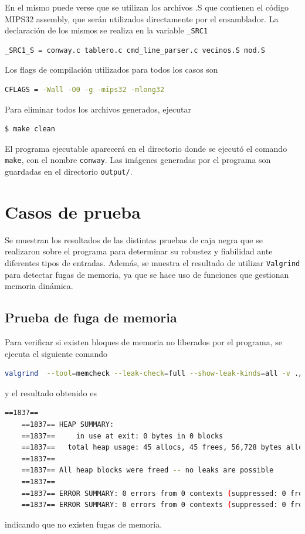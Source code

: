 \documentclass[a4paper,12pt]{article}
\numberwithin{equation}{section}
\numberwithin{figure}{section}
\begin{document}
	En el mismo puede verse que se utilizan los archivos .S que contienen el código MIPS32 assembly, que serán utilizados directamente por el ensamblador. La declaración de los mismos se realiza en la variable \texttt{\_SRC1}
	\begin{lstlisting}[language=bash, style=StyleC]
	_SRC1_S = conway.c tablero.c cmd_line_parser.c vecinos.S mod.S
	\end{lstlisting}
	
	Los flags de compilación utilizados para todos los casos son
	\begin{lstlisting}[language=bash, style=StyleC]
	CFLAGS = -Wall -O0 -g -mips32 -mlong32
	\end{lstlisting}
	
	Para eliminar todos los archivos generados, ejecutar
	\begin{lstlisting}[language=bash, style=StyleC]
	$ make clean
	\end{lstlisting}
	
	El programa ejecutable aparecerá en el directorio donde se ejecutó el comando \texttt{make}, con el nombre \texttt{conway}. Las imágenes generadas por el programa son guardadas en el directorio \texttt{output/}.
	
	\clearpage
	\section{Casos de prueba}
	
	Se muestran los resultados de las distintas pruebas de caja negra que se realizaron sobre el programa para determinar su robustez y fiabilidad ante diferentes tipos de entradas. Además, se muestra el resultado de utilizar \texttt{Valgrind} para detectar fugas de memoria, ya que se hace uso de funciones que gestionan memoria dinámica.
	
	\subsection{Prueba de fuga de memoria}
	
	Para verificar si existen bloques de memoria no liberados por el programa, se ejecuta el siguiente comando
	\begin{lstlisting}[language=bash, style=StyleC]
	valgrind  --tool=memcheck --leak-check=full --show-leak-kinds=all -v ./conway 10 20 20 glider -o estado
	\end{lstlisting}
	y el resultado obtenido es
	\begin{lstlisting}[language=bash, style=StyleC]
	==1837== 
	==1837== HEAP SUMMARY:
	==1837==     in use at exit: 0 bytes in 0 blocks
	==1837==   total heap usage: 45 allocs, 45 frees, 56,728 bytes allocated
	==1837== 
	==1837== All heap blocks were freed -- no leaks are possible
	==1837== 
	==1837== ERROR SUMMARY: 0 errors from 0 contexts (suppressed: 0 from 0)
	==1837== ERROR SUMMARY: 0 errors from 0 contexts (suppressed: 0 from 0)
	\end{lstlisting}
	indicando que no existen fugas de memoria.
	
\end{document}
